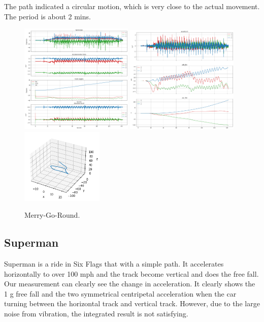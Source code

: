 \documentclass[%
 reprint,
 amsmath,amssymb,
 aps,
]{revtex4-2}
\begin{document}
The path indicated a circular motion, which is very close to the actual movement. The period is about 2 mins.
\begin{figure}[H]
\includegraphics[width=0.48\textwidth]{mgr.png}
\includegraphics[width=0.48\textwidth]{mgr_integrate.png}
\includegraphics[width=0.35\textwidth]{mgr_path.png}
\caption{\label{mgr}Merry-Go-Round.}
\end{figure}


\subsection{Superman}
Superman is a ride in Six Flags\cite{sixflags} that with a simple path. It accelerates horizontally to over 100 mph and the track become vertical and does the free fall. Our measurement can clearly see the change in acceleration. It clearly shows the 1 g free fall and the two symmetrical centripetal acceleration when the car turning between the horizontal track and vertical track. However, due to the large noise from vibration, the integrated result is not satisfying.
\end{document}
